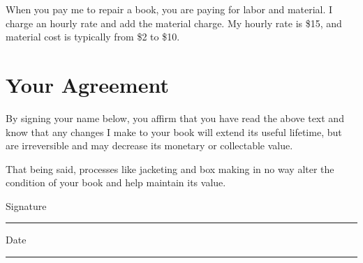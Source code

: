 \documentclass{article}
\begin{document}
When you pay me to repair a book, you are paying for labor and material. I charge an hourly rate and add the material charge. My hourly rate is \$15, and material cost is typically from \$2 to \$10.

\section{Your Agreement}
By signing your name below, you affirm that you have read the above text and know that any changes I make to your book will extend its useful lifetime, but are irreversible and may decrease its monetary or collectable value.

That being said, processes like jacketing and box making in no way alter the condition of your book and help maintain its value.

\vspace{10mm}
Signature
\vspace{5mm}
\noindent\rule{8cm}{0.4pt}

\vspace{5mm}
Date 
\vspace{5mm}
\noindent\rule{8cm}{0.4pt}
\end{document}
